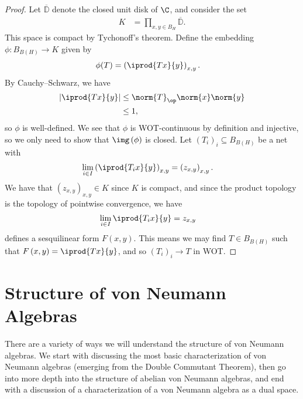 \documentclass[10pt]{mypackage}
\begin{document}
\begin{proof}
  Let $ \overline{\mathbb{D}} $ denote the closed unit disk of $\C$, and consider the set
  \begin{align*}
    K &= \prod_{x,y\in B_H} \overline{\mathbb{D}}.
  \end{align*}
  This space is compact by Tychonoff's theorem. Define the embedding $\phi\colon B_{B(H)}\rightarrow K$ given by
  \begin{align*}
    \phi(T) &= \left( \iprod{Tx}{y} \right)_{x,y}.
  \end{align*}
  By Cauchy--Schwarz, we have
  \begin{align*}
    \left\vert \iprod{Tx}{y} \right\vert &\leq \norm{T}_{\op}\norm{x}\norm{y}\\
                                         &\leq 1,
  \end{align*}
  so $\phi$ is well-defined. We see that $\phi$ is WOT-continuous by definition and injective, so we only need to show that $\img\left( \phi \right)$ is closed. Let $\left( T_i \right)_i\subseteq B_{B(H)}$ be a net with
  \begin{align*}
    \lim_{i\in I} \left( \iprod{T_ix}{y} \right)_{x,y} &= \left( z_{x,y} \right)_{x,y}.
  \end{align*}
  We have that $\left( z_{x,y} \right)_{x,y}\in K$ since $K$ is compact, and since the product topology is the topology of pointwise convergence, we have
  \begin{align*}
    \lim_{i\in I} \iprod{T_ix}{y} &= z_{x,y}
  \end{align*}
  defines a sesquilinear form $F\left( x,y \right)$. This means we may find $T\in B_{B(H)}$ such that $F\left( x,y \right) = \iprod{Tx}{y}$, and so $\left( T_i \right)_i\rightarrow T$ in WOT.
\end{proof}
\section{Structure of von Neumann Algebras}%
There are a variety of ways we will understand the structure of von Neumann algebras. We start with discussing the most basic characterization of von Neumann algebras (emerging from the Double Commutant Theorem), then go into more depth into the structure of abelian von Neumann algebras, and end with a discussion of a characterization of a von Neumann algebra as a dual space.
\end{document}
